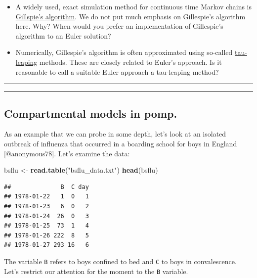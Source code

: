 \documentclass[]{article}
\newenvironment{Shaded}{\begin{snugshade}}{\end{snugshade}}
\newcommand{\KeywordTok}[1]{\textcolor[rgb]{0.13,0.29,0.53}{\textbf{#1}}}
\newcommand{\StringTok}[1]{\textcolor[rgb]{0.31,0.60,0.02}{#1}}
\newcommand{\NormalTok}[1]{#1}
\begin{document}
\begin{itemize}
\item
  A widely used, exact simulation method for continuous time Markov
  chains is
  \href{https://en.wikipedia.org/wiki/Gillespie_algorithm}{Gillspie's
  algorithm}. We do not put much emphasis on Gillespie's algorithm here.
  Why? When would you prefer an implementation of Gillespie's algorithm
  to an Euler solution?
\item
  Numerically, Gillespie's algorithm is often approximated using
  so-called
  \href{https://en.wikipedia.org/wiki/Tau-leaping}{tau-leaping} methods.
  These are closely related to Euler's approach. Is it reasonable to
  call a suitable Euler approach a tau-leaping method?
\end{itemize}

\begin{center}\rule{0.5\linewidth}{\linethickness}\end{center}

\begin{center}\rule{0.5\linewidth}{\linethickness}\end{center}

\subsection{\texorpdfstring{Compartmental models in
\textbf{pomp}.}{Compartmental models in pomp.}}\label{compartmental-models-in-pomp.}

As an example that we can probe in some depth, let's look at an isolated
outbreak of influenza that occurred in a boarding school for boys in
England {[}@anonymous78{]}. Let's examine the data:

\begin{Shaded}
\begin{Highlighting}[]
\NormalTok{bsflu <-}\StringTok{ }\KeywordTok{read.table}\NormalTok{(}\StringTok{"bsflu_data.txt"}\NormalTok{)}
\KeywordTok{head}\NormalTok{(bsflu)}
\end{Highlighting}
\end{Shaded}

\begin{verbatim}
##              B  C day
## 1978-01-22   1  0   1
## 1978-01-23   6  0   2
## 1978-01-24  26  0   3
## 1978-01-25  73  1   4
## 1978-01-26 222  8   5
## 1978-01-27 293 16   6
\end{verbatim}

The variable \texttt{B} refers to boys confined to bed and \texttt{C} to
boys in convalescence. Let's restrict our attention for the moment to
the \texttt{B} variable.
\end{document}
